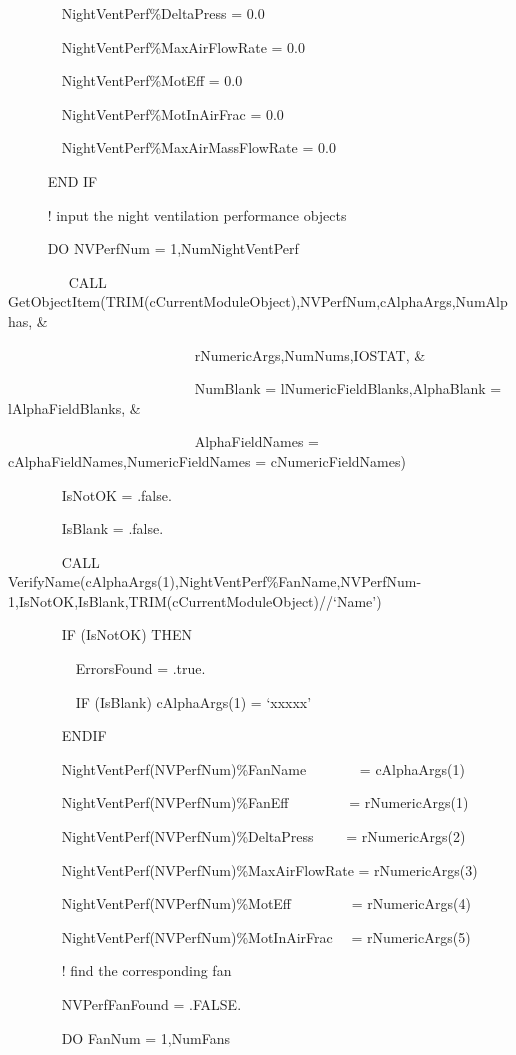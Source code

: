~~~~~~~ NightVentPerf\%DeltaPress = 0.0

~~~~~~~ NightVentPerf\%MaxAirFlowRate = 0.0

~~~~~~~ NightVentPerf\%MotEff = 0.0

~~~~~~~ NightVentPerf\%MotInAirFrac = 0.0

~~~~~~~ NightVentPerf\%MaxAirMassFlowRate = 0.0

~~~~~ END IF

~~~~~ ! input the night ventilation performance objects

~~~~~ DO NVPerfNum = 1,NumNightVentPerf

~~~~~~~~ CALL GetObjectItem(TRIM(cCurrentModuleObject),NVPerfNum,cAlphaArgs,NumAlphas, \&

~~~~~~~~~~~~ ~~~~~~~~~~~~~~rNumericArgs,NumNums,IOSTAT, \&

~~~~~~~~~~~~~~~~~~~~~~~~~~ NumBlank = lNumericFieldBlanks,AlphaBlank = lAlphaFieldBlanks, \&

~~~~~~~~~~~~~~~~~~~~~~~~~~ AlphaFieldNames = cAlphaFieldNames,NumericFieldNames = cNumericFieldNames)

~~~~~~~ IsNotOK = .false.

~~~~~~~ IsBlank = .false.

~~~~~~~ CALL VerifyName(cAlphaArgs(1),NightVentPerf\%FanName,NVPerfNum-1,IsNotOK,IsBlank,TRIM(cCurrentModuleObject)//`Name')

~~~~~~~ IF (IsNotOK) THEN

~~~~~~~~~ ErrorsFound = .true.

~~~~~~~~~ IF (IsBlank) cAlphaArgs(1) = `xxxxx'

~~~~~~~ ENDIF

~~~~~~~ NightVentPerf(NVPerfNum)\%FanName~~~~~~~ = cAlphaArgs(1)

~~~~~~~ NightVentPerf(NVPerfNum)\%FanEff~~~~~~~~ = rNumericArgs(1)

~~~~~~~ NightVentPerf(NVPerfNum)\%DeltaPress~~~~ = rNumericArgs(2)

~~~~~~~ NightVentPerf(NVPerfNum)\%MaxAirFlowRate = rNumericArgs(3)

~~~~~~~ NightVentPerf(NVPerfNum)\%MotEff~~~~~~~~ = rNumericArgs(4)

~~~~~~~ NightVentPerf(NVPerfNum)\%MotInAirFrac~~ = rNumericArgs(5)

~~~~~~~ ! find the corresponding fan

~~~~~~~ NVPerfFanFound = .FALSE.

~~~~~~~ DO FanNum = 1,NumFans


